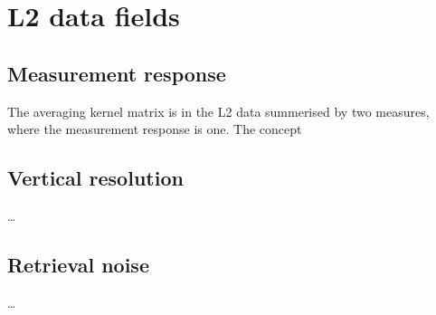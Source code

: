 \section{L2 data fields}
%

\subsection{Measurement response}
\label{sec:mresp}
%
The averaging kernel matrix is in the L2 data summerised by two measures, where
the measurement response is one. The concept 


\subsection{Vertical resolution}
\label{sec:mresp}
%
\dots


\subsection{Retrieval noise}
\label{sec:reterr}
%
\dots






